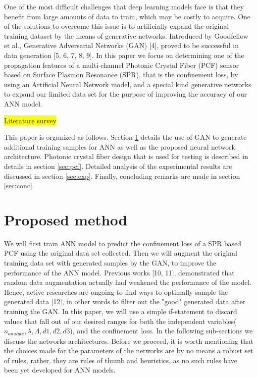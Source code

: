 \documentclass[draft, a4, 10pt, onecolumn]{IEEEtran}
\begin{document}
One of the most difficult challenges that deep learning models face is that they benefit from large amounts of data to train, which may be costly to acquire. One of the solutions to overcome this issue is to artificially expand the original training dataset by the means of generative networks. Introduced by Goodfellow et al., Generative Adversarial Networks (GAN) [4], proved to be successful in data generation [5, 6, 7, 8, 9]. 
In this paper we focus on determining one of the propagation features of a multi-channel Photonic Crystal Fiber (PCF) sensor based on Surface Plasmon Resonance (SPR), that is the confinement loss, by using an Artificial Neural Network model, and a special kind generative networks to expand our limited data set for the purpose of  improving the accuracy of our ANN model.

\hl{Literature survey}

This paper is organized as follows. Section \ref{sec:prop} details the use of GAN to generate additional training samples for ANN as well as the proposed neural network architecture. Photonic crystal fiber design that is used for testing is described in details in section \ref{sec:pcf}. Detailed analysis of the experimental results are discussed in section \ref{sec:exp}. Finally, concluding remarks are made in section \ref{sec:conc}.

\section{Proposed method}
\label{sec:prop}

We will first train ANN model to predict the confinement loss of a SPR based PCF using the original data set collected. Then we will augment the original training data set with generated samples by the GAN, to improve the performance of the ANN model.
Previous works [10, 11], demonstrated that random data augmentation actually had weakened the performance of the model. Hence, active researches are ongoing to find ways to optimally sample the generated data [12], in other words to filter out the "good" generated data after training the GAN. In this paper, we will use a simple if-statement to discard values that fall out of our desired ranges for both the independent variables($n_{analyte}, \lambda, \Lambda, d1, d2, d3$), and the confinement loss. In the following sub-sections we discuss the networks architectures. Before we proceed, it is worth mentioning that the choices made for the parameters of the networks are by no means a robust set of rules, rather, they are rules of thumb and heuristics, as no such rules have been yet developed for ANN models.
\end{document}
